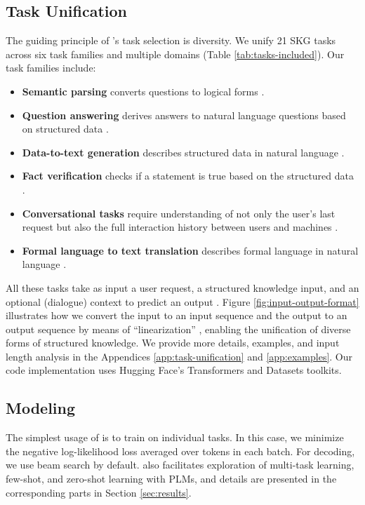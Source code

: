 \documentclass[11pt]{article}
\newcommand{\ntasks}{21\xspace}
\begin{document}
\subsection{Task Unification}
\label{subsec:task_unification}
The guiding principle of \uskg{}'s task selection is diversity. We unify \ntasks SKG tasks across six task families and multiple domains (Table \ref{tab:tasks-included}). Our task families include:
\begin{itemize}[leftmargin=*]
    \item \textbf{Semantic parsing} converts questions to logical forms \cite{ZelleM96,Zettlemoyer05}.
    \item \textbf{Question answering} derives answers to natural language questions based on structured data \cite{BerantCFL13}.
    \item \textbf{Data-to-text generation} describes structured data in natural language \cite{NovikovaDR17}.
    \item \textbf{Fact verification} checks if a statement is true based on the structured data \cite{2019TabFactA}.
    \item \textbf{Conversational tasks} require understanding of not only the user's last request but also the full interaction history between users and machines \cite{budzianowski2018large, eric2019multiwoz, yu-etal-2019-cosql}.
    \item \textbf{Formal language to text translation} describes formal language in natural language \cite{chen-etal-2020-logic2text}. 
\end{itemize}

All these tasks take as input  a user request, a structured knowledge input, and an optional (dialogue) context to predict an output .
Figure \ref{fig:input-output-format} illustrates how we convert the input  to an input sequence  and the output  to an output sequence  by means of ``linearization'' \cite{liu2021tapex}, enabling the unification of diverse forms of structured knowledge. We provide more details, examples, and input length analysis in the Appendices \ref{app:task-unification} and \ref{app:examples}.
Our code implementation uses Hugging Face's Transformers \cite{wolf-etal-2020-transformers} and Datasets \cite{lhoest2021datasets} toolkits. 

\subsection{Modeling}
The simplest usage of \uskg is to train on individual tasks. In this case, we minimize the negative log-likelihood loss averaged over tokens in each batch. 
For decoding, we use beam search by default.
\uskg also facilitates exploration of multi-task learning, few-shot, and zero-shot learning with PLMs, and details are presented in the corresponding parts in Section \ref{sec:results}. 
 
\end{document}
